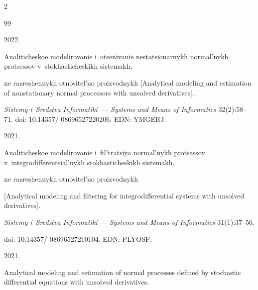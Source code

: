   \begin{multicols}{2}



\renewcommand{\bibname}{\protect\rmfamily References}




{\small\frenchspacing

 {\baselineskip=11.8pt


 \begin{thebibliography}{99} 



 2022. 

Analiticheskoe modelirovanie i~otsenivanie nestatsionarnykh normal'nykh protsessov v~stokhasticheskikh sistemakh, 

ne razreshennykh otnositel'no proizvodnykh [Analytical modeling and estimation of nonstationary normal processors with unsolved derivatives]. 

\textit{Sistemy i~Sredstva Informatiki~--- Systems and Means of Informatics} 32(2):58--71. doi: 10.14357/ 08696527220206. EDN: YMGERJ.





 2021. 

Analiticheskoe modelirovanie i~fil'tratsiya normal'nykh protsessov v~integ\-ro\-dif\-fe\-ren\-tsi\-al'\-nykh stokhasticheskikh sistemakh, 

ne razreshennykh otnositel'no proizvodnykh 

[Analytical modeling and filtering for integrodifferential systems with unsolved derivatives]. 

\textit{Sistemy i~Sredstva Informatiki --- Systems and Means of Informatics} 31(1):37--56.

doi: 10.14357/ 08696527210104. EDN: PLYOSF.





 2021. 

Analytical modeling and estimation of normal processes defined by stochastic differential equations with unsolved derivatives. 


\end{thebibliography}}}
\end{multicols}
